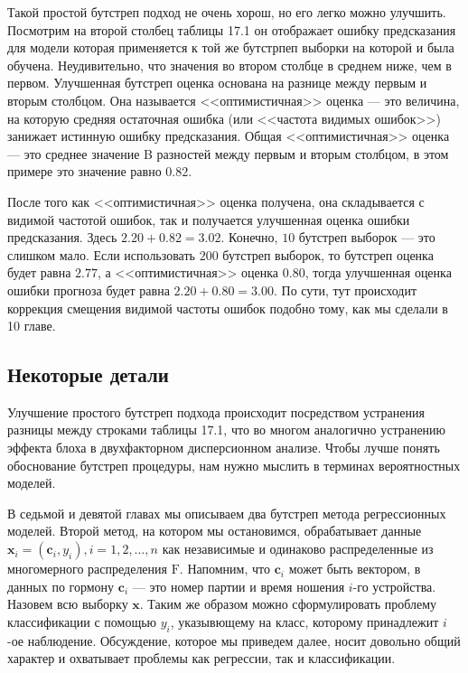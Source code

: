 Такой простой бутстреп подход не очень хорош, но его легко можно улучшить. Посмотрим на второй столбец таблицы 17.1 он отображает ошибку предсказания для модели которая применяется к той же бутстрпеп выборки на которой и была обучена. Неудивительно, что значения во втором столбце в среднем ниже, чем в первом. Улучшенная бутстреп оценка основана на разнице между первым и вторым столбцом. Она называется <<оптимистичная>> оценка --- это величина, на которую средняя остаточная ошибка (или <<частота видимых ошибок>>) занижает истинную ошибку предсказания. Общая <<оптимистичная>> оценка --- это среднее значение B разностей между первым и вторым столбцом, в этом примере это значение равно $0.82$.


После того как <<оптимистичная>> оценка получена, она складывается с видимой частотой ошибок, так и получается улучшенная оценка ошибки предсказания. Здесь $2.20 + 0.82 = 3.02$. Конечно, $10$ бутстреп выборок --- это слишком мало. Если использовать $200$ бутстреп выборок, то бутстреп оценка будет равна $2.77$, а <<оптимистичная>> оценка $0.80$, тогда улучшенная оценка ошибки прогноза будет равна $2.20 + 0.80 = 3.00$. По сути, тут происходит коррекция смещения видимой частоты ошибок подобно тому, как мы сделали в 10 главе.


\subsection{Некоторые детали}
Улучшение простого бутстреп подхода происходит посредством устранения разницы между строками таблицы 17.1, что во многом аналогично устранению эффекта блоха в двухфакторном дисперсионном анализе. Чтобы лучше понять обоснование бутстреп процедуры, нам нужно мыслить в терминах вероятностных моделей.

В седьмой и девятой главах мы описываем два бутстреп метода регрессионных моделей. Второй метод, на котором мы остановимся, обрабатывает данные $\textbf{x}_{i} = (\textbf{c}_{i}, y_{i}), i = 1, 2,\ldots,n$ как независимые и одинаково распределенные из многомерного распределения $\text{F}$. Напомним, что $\textbf{c}_{i}$ может быть вектором, в данных по гормону $\textbf{c}_{i}$ --- это номер партии и время ношения $i$-го устройства. Назовем всю выборку $\textbf{x}$. Таким же образом можно сформулировать проблему классификации с помощью $y_{i}$, указывющему на класс, которому принадлежит $i$-ое наблюдение. Обсуждение, которое мы приведем далее, носит довольно общий характер и охватывает проблемы как регрессии, так и классификации.

